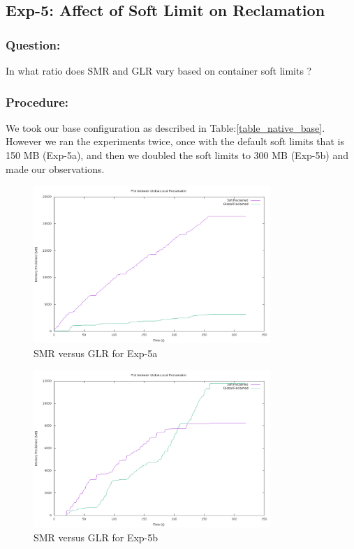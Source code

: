       \subsection{Exp-5: Affect of Soft Limit on Reclamation}
	\label{soft_limit}
	
	\subsubsection{Question:} 
	  In what ratio does SMR and GLR vary based on container soft limits ?
	
	\subsubsection{Procedure:}
	  We took our base configuration as described in Table:\ref{table_native_base}. However we ran the experiments twice, 
once with the default soft limits that is 150 MB (Exp-5a), and then we doubled the soft limits to 300 MB (Exp-5b) and made our observations.
		
	\begin{figure}
	  \centering
	  \includegraphics[width=0.8\textwidth]{images/experimentation/sl_vary/1/compare.png}
	  \caption{SMR versus GLR for Exp-5a}
	  \label{img_sl_vary_1_compare}
	\end{figure}
	
	\begin{figure}
	  \centering
	  \includegraphics[width=0.8\textwidth]{images/experimentation/sl_vary/2/compare.png}
	  \caption{SMR versus GLR for Exp-5b}
	  \label{img_sl_vary_2_compare}
	\end{figure}	
	
